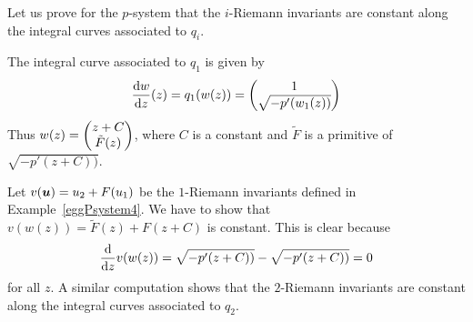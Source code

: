 \begin{egg}
Let us prove for the $p$-system that the $i$-Riemann invariants
are constant along the integral curves associated to $q_i$.

The integral curve associated to $q_1$ is given by
\[
\dydx{w}{z}(z) = q_1(w(z)) = \begin{pmatrix} 1 \\ \sqrt{-p'(w_1(z))}
\end{pmatrix}
\]
Thus $\DS w(z) = \begin{pmatrix} z + C \\ \tilde{F}(z) \end{pmatrix}$,
where $C$ is a constant and $\tilde{F}$ is a primitive of $\sqrt{-p'(z+C))}$.

Let $v(\VEC{u}) = u_2 + F(u_1)$ be the $1$-Riemann invariants defined in
Example~\ref{eggPsystem4}. We have to show that
$v(w(z)) = \tilde{F}(z) + F(z+C)$ is constant.  This is clear because
\[
\dfdx{v(w(z))}{z} = \sqrt{-p'(z+C))} - \sqrt{-p'(z+C))} = 0
\]
for all $z$.  A similar computation shows that the $2$-Riemann invariants
are constant along the integral curves associated to $q_2$.
\end{egg}

